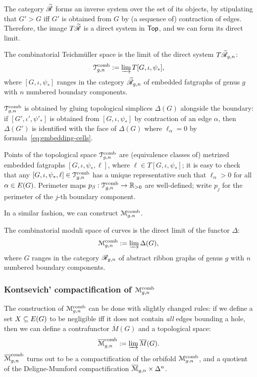 The category $\mathscr{\widetilde R}$ forms an inverse system over the set of its
objects, by stipulating that $G' > G$ iff $G'$ is obtained from $G$ by
(a sequence of) contraction of edges.  Therefore, the image $T\mathscr{\widetilde R}$ is
a direct system in $\mathsf{Top}$, and we can form its direct limit.
\begin{definition}
  The combinatorial Teichm\"uller space is the limit of the direct
  system $T\mathscr{\widetilde R}_{g,n}$:
  \begin{equation*}
    \mathcal{T}\sp{\text{comb}}_{g,n} := \varinjlim T[G, \iota, \psi_*],
  \end{equation*}
  where $[G, \iota, \psi_*]$ ranges in the category $\mathscr{\widetilde R}_{g,n}$ of embedded
  fatgraphs of genus $g$ with $n$ numbered boundary components.
\end{definition}
$\mathcal{T}\sp{\text{comb}}_{g,n}$ is obtained by gluing topological simplices $\Delta(G)$ alongside
the boundary: if $[G', \iota', \psi'_*]$ is obtained from $[G, \iota, \psi_*]$ by
contraction of an edge $\alpha$, then $\Delta(G')$ is identified with the face
of $\Delta(G)$ where $\ell_\alpha = 0$ by formula~\ref{eq:embedding-cells}.

Points of the topological space $\mathcal{T}\sp{\text{comb}}_{g,n}$ are (equivalence
classes of) metrized embedded fatgraphs $[G, \iota, \psi_*, \ell]$, where $\ell
\in T[G, \iota, \psi_*]$; it is easy to check that any $[G, \iota, \psi_*, \ell] \in
\mathcal{T}\sp{\text{comb}}_{g,n}$ has a unique representative such that $\ell_\alpha > 0$ for all
$\alpha \in E(G)$.  Perimeter maps $p_\beta: \mathcal{T}\sp{\text{comb}}_{g,n} \to \mathbb{R}_{>0}$ are
well-defined; write $p_j$ for the perimeter of the $j$-th boundary
component.

In a similar fashion, we can construct $\mathcal{M}\sp{\text{comb}}_{g,n}$.
\begin{definition}
  The combinatorial moduli space of curves is the direct limit of the
  functor $\Delta$:
  \begin{equation*}
    \mathcal{M}\sp{\text{comb}}_{g,n} := \varinjlim \Delta(G),
  \end{equation*}
  where $G$ ranges in the category $\mathscr{R}_{g,n}$ of abstract ribbon
  graphs of genus $g$ with $n$ numbered boundary components.
\end{definition}

\subsubsection{Kontsevich' compactification of $\mathcal{M}\sp{\text{comb}}_{g,n}$}
\label{sec:mbarcomb}
The construction of $\mathcal{M}\sp{\text{comb}}_{g,n}$ can be done with slightly changed
rules: if we define a set $X \subseteq E(G)$ to be negligible iff it does
not contain \emph{all} edges bounding a hole, then we can define a
contrafunctor $\overline{M}(G)$ and a topological space:
\begin{equation*}
  \label{eq:kontsevich-4}
  \overline{\mathcal{M}}\sp{\text{comb}}_{g,n} := \varinjlim \overline{M}(G).
\end{equation*}
$\overline{\mathcal{M}}\sp{\text{comb}}_{g,n}$ turns out to be a compactification of the orbifold
$\mathcal{M}\sp{\text{comb}}_{g,n}$, and a quotient of the Deligne-Mumford compactification
$\overline{\mathcal{M}}_{g,n} \times \Delta^n$.

